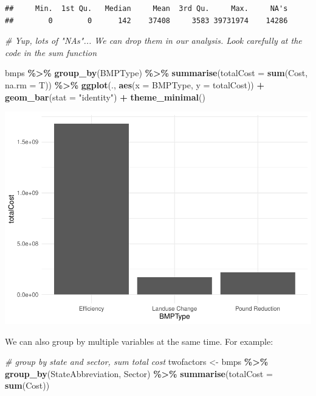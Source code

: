 \documentclass[]{article}
\newenvironment{Shaded}{\begin{snugshade}}{\end{snugshade}}
\newcommand{\AttributeTok}[1]{\textcolor[rgb]{0.13,0.29,0.53}{#1}}
\newcommand{\CommentTok}[1]{\textcolor[rgb]{0.56,0.35,0.01}{\textit{#1}}}
\newcommand{\FunctionTok}[1]{\textcolor[rgb]{0.13,0.29,0.53}{\textbf{#1}}}
\newcommand{\NormalTok}[1]{#1}
\newcommand{\OtherTok}[1]{\textcolor[rgb]{0.56,0.35,0.01}{#1}}
\newcommand{\SpecialCharTok}[1]{\textcolor[rgb]{0.81,0.36,0.00}{\textbf{#1}}}
\newcommand{\StringTok}[1]{\textcolor[rgb]{0.31,0.60,0.02}{#1}}
\begin{document}
\begin{verbatim}
##     Min.  1st Qu.   Median     Mean  3rd Qu.     Max.     NA's 
##        0        0      142    37408     3583 39731974    14286
\end{verbatim}

\begin{Shaded}
\begin{Highlighting}[]
\CommentTok{\# Yup, lots of "NA\textquotesingle{}s"... We can drop them in our analysis. Look carefully at the code in the \textquotesingle{}sum\textquotesingle{} function}


\NormalTok{bmps }\SpecialCharTok{\%\textgreater{}\%} \FunctionTok{group\_by}\NormalTok{(BMPType) }\SpecialCharTok{\%\textgreater{}\%} \FunctionTok{summarise}\NormalTok{(}\AttributeTok{totalCost =} \FunctionTok{sum}\NormalTok{(Cost, }\AttributeTok{na.rm =}\NormalTok{ T)) }\SpecialCharTok{\%\textgreater{}\%}
  \FunctionTok{ggplot}\NormalTok{(., }\FunctionTok{aes}\NormalTok{(}\AttributeTok{x =}\NormalTok{ BMPType, }\AttributeTok{y =}\NormalTok{ totalCost)) }\SpecialCharTok{+}
  \FunctionTok{geom\_bar}\NormalTok{(}\AttributeTok{stat =} \StringTok{"identity"}\NormalTok{) }\SpecialCharTok{+}
  \FunctionTok{theme\_minimal}\NormalTok{()}
\end{Highlighting}
\end{Shaded}

\includegraphics{lab02_files/figure-latex/review-2.pdf}

We can also group by multiple variables at the same time. For example:

\begin{Shaded}
\begin{Highlighting}[]
\CommentTok{\# group by state and sector, sum total cost}
\NormalTok{twofactors }\OtherTok{\textless{}{-}}\NormalTok{ bmps }\SpecialCharTok{\%\textgreater{}\%} \FunctionTok{group\_by}\NormalTok{(StateAbbreviation, Sector) }\SpecialCharTok{\%\textgreater{}\%} \FunctionTok{summarise}\NormalTok{(}\AttributeTok{totalCost =} \FunctionTok{sum}\NormalTok{(Cost))}
\end{Highlighting}
\end{Shaded}
\end{document}
